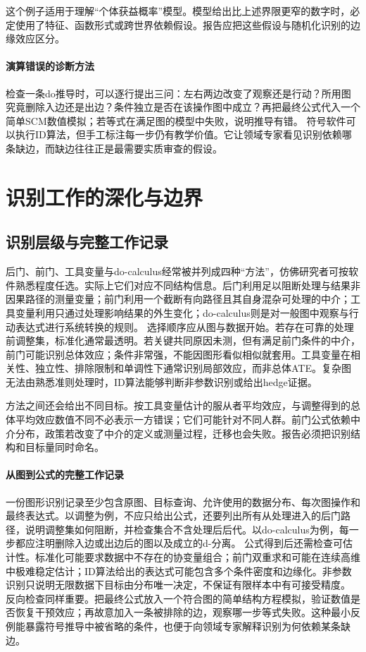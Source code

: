 这个例子适用于理解“个体获益概率”模型。模型给出比上述界限更窄的数字时，必定使用了特征、函数形式或跨世界依赖假设。报告应把这些假设与随机化识别的边缘效应区分。

\paragraph{演算错误的诊断方法}

检查一条do推导时，可以逐行提出三问：左右两边改变了观察还是行动？所用图究竟删除入边还是出边？条件独立是否在该操作图中成立？再把最终公式代入一个简单SCM数值模拟；若等式在满足图的模型中失败，说明推导有错。
符号软件可以执行ID算法，但手工标注每一步仍有教学价值。它让领域专家看见识别依赖哪条缺边，而缺边往往正是最需要实质审查的假设。

\section{识别工作的深化与边界}

\subsection{识别层级与完整工作记录}

后门、前门、工具变量与do-calculus经常被并列成四种“方法”，仿佛研究者可按软件熟悉程度任选。实际上它们对应不同结构信息。后门利用足以阻断处理与结果非因果路径的测量变量；前门利用一个截断有向路径且其自身混杂可处理的中介；工具变量利用只通过处理影响结果的外生变化；do-calculus则是对一般图中观察与行动表达式进行系统转换的规则。
选择顺序应从图与数据开始。若存在可靠的处理前调整集，标准化通常最透明。若关键共同原因未测，但有满足前门条件的中介，前门可能识别总体效应；条件非常强，不能因图形看似相似就套用。工具变量在相关性、独立性、排除限制和单调性下通常识别局部效应，而非总体ATE。复杂图无法由熟悉准则处理时，ID算法能够判断非参数识别或给出hedge证据。

方法之间还会给出不同目标。按工具变量估计的服从者平均效应，与调整得到的总体平均效应数值不同不必表示一方错误；它们可能针对不同人群。前门公式依赖中介分布，政策若改变了中介的定义或测量过程，迁移也会失败。报告必须把识别结构和目标量同时命名。

\paragraph{从图到公式的完整工作记录}

一份图形识别记录至少包含原图、目标查询、允许使用的数据分布、每次图操作和最终表达式。以调整为例，不应只给出公式，还要列出所有从处理进入的后门路径，说明调整集如何阻断，并检查集合不含处理后后代。以do-calculus为例，每一步都应注明删除入边或出边后的图以及成立的d-分离。
公式得到后还需检查可估计性。标准化可能要求数据中不存在的协变量组合；前门双重求和可能在连续高维中极难稳定估计；ID算法给出的表达式可能包含多个条件密度和边缘化。非参数识别只说明无限数据下目标由分布唯一决定，不保证有限样本中有可接受精度。
反向检查同样重要。把最终公式放入一个符合图的简单结构方程模拟，验证数值是否恢复干预效应；再故意加入一条被排除的边，观察哪一步等式失败。这种最小反例能暴露符号推导中被省略的条件，也便于向领域专家解释识别为何依赖某条缺边。

